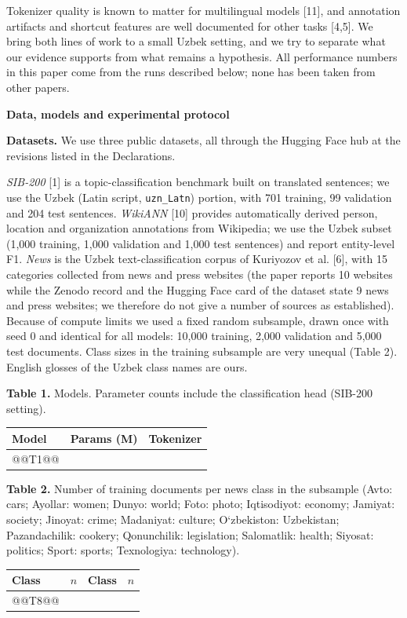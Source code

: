 \documentclass[11pt]{book}
\begin{document}
Tokenizer quality is known to matter for multilingual models [11], and annotation artifacts and shortcut features are well documented for other tasks [4,5]. We bring both lines of work to a small Uzbek setting, and we try to separate what our evidence supports from what remains a hypothesis. All performance numbers in this paper come from the runs described below; none has been taken from other papers.

\begin{center}
\textbf{Data, models and experimental protocol}
\end{center}

\textbf{Datasets.} We use three public datasets, all through the Hugging Face hub at the revisions listed in the Declarations.

\emph{SIB-200} [1] is a topic-classification benchmark built on translated sentences; we use the Uzbek (Latin script, \texttt{uzn\_Latn}) portion, with 701 training, 99 validation and 204 test sentences. \emph{WikiANN} [10] provides automatically derived person, location and organization annotations from Wikipedia; we use the Uzbek subset (1,000 training, 1,000 validation and 1,000 test sentences) and report entity-level F1. \emph{News} is the Uzbek text-classification corpus of Kuriyozov et al. [6], with 15 categories collected from news and press websites (the paper reports 10 websites while the Zenodo record and the Hugging Face card of the dataset state 9 news and press websites; we therefore do not give a number of sources as established). Because of compute limits we used a fixed random subsample, drawn once with seed 0 and identical for all models: 10,000 training, 2,000 validation and 5,000 test documents. Class sizes in the training subsample are very unequal (Table 2). English glosses of the Uzbek class names are ours.

\begin{center}
\textbf{Table 1.} Models. Parameter counts include the classification head (SIB-200 setting).\\[2pt]
\begin{tabular}{lrl}
\hline
Model & Params (M) & Tokenizer \\
\hline
@@T1@@
\hline
\end{tabular}
\end{center}

\begin{center}
\textbf{Table 2.} Number of training documents per news class in the subsample (Avto: cars; Ayollar: women; Dunyo: world; Foto: photo; Iqtisodiyot: economy; Jamiyat: society; Jinoyat: crime; Madaniyat: culture; O\textquoteleft zbekiston: Uzbekistan; Pazandachilik: cookery; Qonunchilik: legislation; Salomatlik: health; Siyosat: politics; Sport: sports; Texnologiya: technology).\\[2pt]
\begin{tabular}{lrlr}
\hline
Class & $n$ & Class & $n$ \\
\hline
@@T8@@
\hline
\end{tabular}
\end{center}
\end{document}
